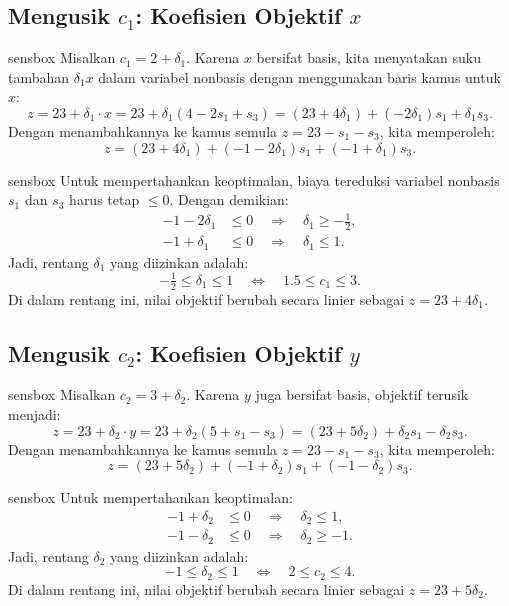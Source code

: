 \subsection{Mengusik \( c_1 \): Koefisien Objektif \( x \)}

\begin{steppanel}{sensbox}
Misalkan \( c_1 = 2 + \delta_1 \). Karena \( x \) bersifat basis, kita menyatakan suku tambahan \( \delta_1 x \) dalam variabel nonbasis dengan menggunakan baris kamus untuk \( x \):
\[
z = 23 + \delta_1 \cdot x = 23 + \delta_1(4 - 2s_1 + s_3)
= (23 + 4\delta_1) + (-2\delta_1)s_1 + \delta_1 s_3.
\]
Dengan menambahkannya ke kamus semula \( z = 23 - s_1 - s_3 \), kita memperoleh:
\[
z = (23 + 4\delta_1) + (-1 - 2\delta_1)s_1 + (-1 + \delta_1)s_3.
\]
\end{steppanel}

\begin{steppanel}{sensbox}
Untuk mempertahankan keoptimalan, biaya tereduksi variabel nonbasis \( s_1 \) dan \( s_3 \) harus tetap \( \leq 0 \). Dengan demikian:
\[
\begin{aligned}
-1 - 2\delta_1 &\leq 0 \quad \Rightarrow \quad \delta_1 \geq -\tfrac{1}{2}, \\
-1 + \delta_1 &\leq 0 \quad \Rightarrow \quad \delta_1 \leq 1.
\end{aligned}
\]
Jadi, rentang \( \delta_1 \) yang diizinkan adalah:
\[
\boxed{-\tfrac{1}{2} \leq \delta_1 \leq 1}
\quad\Longleftrightarrow\quad
1.5 \leq c_1 \leq 3.
\]
Di dalam rentang ini, nilai objektif berubah secara linier sebagai \( z = 23 + 4\delta_1 \).
\end{steppanel}

\subsection{Mengusik \( c_2 \): Koefisien Objektif \( y \)}

\begin{steppanel}{sensbox}
Misalkan \( c_2 = 3 + \delta_2 \). Karena \( y \) juga bersifat basis, objektif terusik menjadi:
\[
z = 23 + \delta_2 \cdot y = 23 + \delta_2(5 + s_1 - s_3)
= (23 + 5\delta_2) + \delta_2 s_1 - \delta_2 s_3.
\]
Dengan menambahkannya ke kamus semula \( z = 23 - s_1 - s_3 \), kita memperoleh:
\[
z = (23 + 5\delta_2) + (-1 + \delta_2)s_1 + (-1 - \delta_2)s_3.
\]
\end{steppanel}

\begin{steppanel}{sensbox}
Untuk mempertahankan keoptimalan:
\[
\begin{aligned}
-1 + \delta_2 &\leq 0 \quad \Rightarrow \quad \delta_2 \leq 1, \\
-1 - \delta_2 &\leq 0 \quad \Rightarrow \quad \delta_2 \geq -1.
\end{aligned}
\]
Jadi, rentang \( \delta_2 \) yang diizinkan adalah:
\[
\boxed{-1 \leq \delta_2 \leq 1}
\quad\Longleftrightarrow\quad
2 \leq c_2 \leq 4.
\]
Di dalam rentang ini, nilai objektif berubah secara linier sebagai \( z = 23 + 5\delta_2 \).
\end{steppanel}


